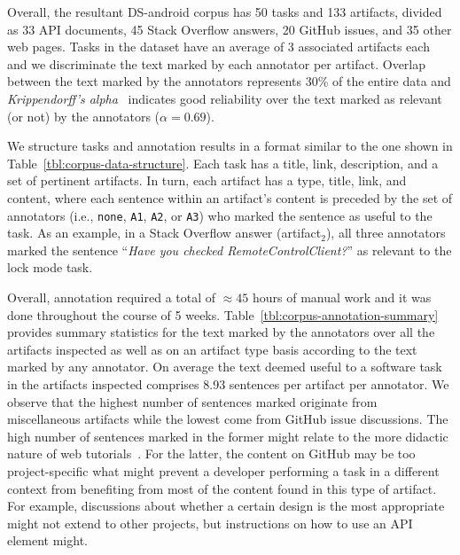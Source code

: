 Overall, the resultant \acs{DS-android} corpus has
50 tasks and 133 artifacts, divided as 33 API documents, 45 Stack Overflow answers, 20 GitHub issues, and 35 other web pages.
Tasks in the dataset have an average of 3 associated artifacts each
and we discriminate the text marked by each annotator per artifact.
Overlap between the text marked by the annotators represents 30\% of the entire data 
and \textit{Krippendorff's alpha}~\cite{krippendorff2018} indicates 
 good reliability\cite{Nenkova2004} over the text marked as relevant (or not) by the annotators ($\alpha=0.69$).



We structure tasks and annotation results in a format similar to the one shown in 
Table~\ref{tbl:corpus-data-structure}. 
Each task has a  title, link, description, and a set of pertinent artifacts.
In turn, each artifact has a type, title, link, and content,
where each sentence within an artifact's content
is preceded by the set of 
annotators (i.e., \texttt{none}, \texttt{A1}, \texttt{A2}, or \texttt{A3}) who marked the sentence as useful to the task.
As an example, in a Stack Overflow answer (artifact$_2$), all three annotators 
marked the sentence ``\textit{Have you checked RemoteControlClient?}''
as relevant to the lock mode task.


Overall, annotation required a total of $\approx45$ hours of manual work and it was done throughout the course of 5 weeks.
Table~\ref{tbl:corpus-annotation-summary} provides summary statistics for the text marked by 
the annotators over all the artifacts inspected as well as on an artifact type basis according to the text marked by any annotator.    
On average the text deemed useful to a software task in the artifacts inspected comprises 
8.93 sentences per artifact per annotator.
We observe that the highest number of sentences marked originate from miscellaneous artifacts
while the lowest come from GitHub issue discussions. 
The high number of sentences marked in the former might relate to the more didactic nature of web tutorials~\cite{arya2020, Jiang2017}.
For the latter, the content on GitHub may be too project-specific what might 
prevent a developer performing a task in a different context from benefiting from most of the content found in this type of artifact.
For example, discussions about whether a certain design is the most appropriate~\cite{Viviani2019} might not extend to other projects, but instructions on how to use an API element might.



